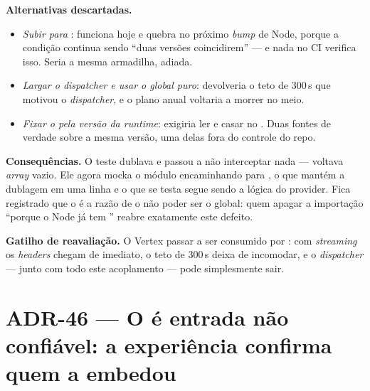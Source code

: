 \textbf{Alternativas descartadas.}
\begin{itemize}
  \item \emph{Subir  para }: funciona hoje e quebra no
    próximo \emph{bump} de Node, porque a condição continua sendo ``duas versões
    coincidirem'' --- e nada no CI verifica isso. Seria a mesma armadilha,
    adiada.
  \item \emph{Largar o \emph{dispatcher} e usar o  global puro}:
    devolveria o teto de 300\,s que motivou o \emph{dispatcher}, e o plano anual
    voltaria a morrer no meio.
  \item \emph{Fixar o  pela versão da \emph{runtime}}: exigiria ler
     e casar no . Duas fontes de
    verdade sobre a mesma versão, uma delas fora do controle do repo.
\end{itemize}

\textbf{Consequências.} O teste  dublava
 e passou a não interceptar nada --- voltava \emph{array}
vazio. Ele agora mocka o módulo  encaminhando para ,
o que mantém a dublagem em uma linha e o que se testa segue sendo a lógica do
provider. Fica registrado que o  é a razão de o  não
poder ser o global: quem apagar a importação ``porque o Node já tem ''
reabre exatamente este defeito.

\textbf{Gatilho de reavaliação.} O Vertex passar a ser consumido por
: com \emph{streaming} os \emph{headers} chegam
de imediato, o teto de 300\,s deixa de incomodar, e o \emph{dispatcher} ---
junto com todo este acoplamento --- pode simplesmente sair.

\section{ADR-46 --- O  é entrada não confiável: a experiência confirma quem a embedou}
\label{adr:hub-origin}

